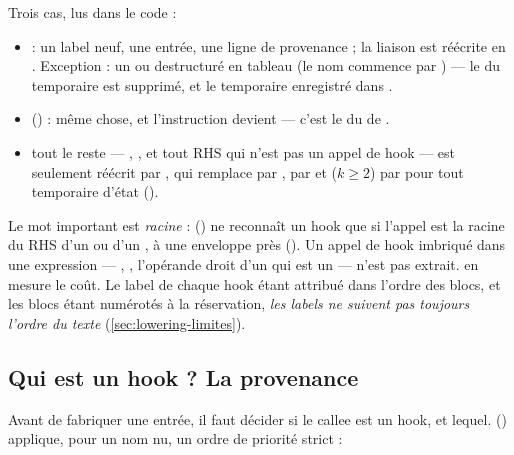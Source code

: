 Trois cas, lus dans le code :

\begin{itemize}
  \item {} : un label neuf, une entrée, une ligne de provenance ; la liaison est réécrite en . Exception : un  ou  destructuré en tableau (le nom commence par ) --- le  du temporaire est supprimé, et le temporaire enregistré dans .
  \item {} () : même chose, et l'instruction devient  --- c'est le  du  de .
  \item tout le reste --- , , et tout RHS qui n'est pas un appel de hook --- est seulement réécrit par , qui remplace  par ,  par  et  ($k \geq 2$) par  pour tout temporaire d'état  ().
\end{itemize}

Le mot important est \emph{racine} :  () ne reconnaît un hook que si l'appel est la racine du RHS d'un  ou d'un , à une enveloppe  près (). Un appel de hook imbriqué dans une expression --- , , l'opérande droit d'un \code{&&} qui est un  --- n'est pas extrait.  en mesure le coût. Le label de chaque hook étant attribué dans l'ordre des blocs, et les blocs étant numérotés à la réservation, \emph{les labels ne suivent pas toujours l'ordre du texte} (\cref{sec:lowering-limites}).

\subsection{Qui est un hook ? La provenance}

Avant de fabriquer une entrée, il faut décider si le callee est un hook, et lequel.  () applique, pour un nom nu, un ordre de priorité strict :

